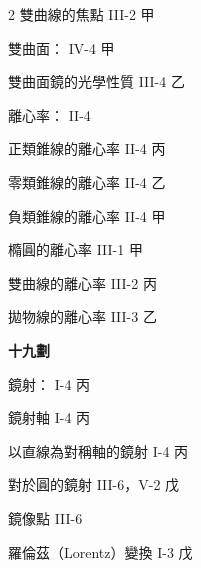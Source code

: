 \begin{multicols}{2}
\noindent\hspace*{1.5em} 雙曲線的焦點 \hfill III-2 甲\par
\noindent 雙曲面： \hfill IV-4 甲\par
\noindent\hspace*{1.5em} 雙曲面鏡的光學性質 \hfill III-4 乙\par
\noindent 離心率： \hfill II-4\par
\noindent\hspace*{1.5em} 正類錐線的離心率 \hfill II-4 丙\par
\noindent\hspace*{1.5em} 零類錐線的離心率 \hfill II-4 乙\par
\noindent\hspace*{1.5em} 負類錐線的離心率 \hfill II-4 甲\par
\noindent\hspace*{1.5em} 橢圓的離心率 \hfill III-1 甲\par
\noindent\hspace*{1.5em} 雙曲線的離心率 \hfill III-2 丙\par
\noindent\hspace*{1.5em} 拋物線的離心率 \hfill III-3 乙\par

\vspace{0.8em}
\begin{center}
\textbf{\large 十九劃}
\end{center}

\noindent 鏡射： \hfill I-4 丙\par
\noindent\hspace*{1.5em} 鏡射軸 \hfill I-4 丙\par
\noindent\hspace*{1.5em} 以直線為對稱軸的鏡射 \hfill I-4 丙\par
\noindent\hspace*{1.5em} 對於圓的鏡射 \hfill III-6，V-2 戊\par
\noindent 鏡像點 \hfill III-6\par
\noindent 羅倫茲（Lorentz）變換 \hfill I-3 戊\par

\end{multicols}
